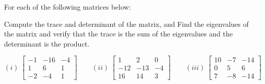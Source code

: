 \begin{exercise}\ansMark%
For each of the following matrices below:
\begin{tasks}
\task Compute the trace and determinant of the matrix, and
\task Find the eigenvalues of the matrix and verify that the trace is the sum of the eigenvalues and the determinant is the product. 
\end{tasks}
\begin{equation*}
(i) \ \begin{bmatrix} -1 & -16 & -4 \\ 1 & 6 & 1 \\ -2 & -4 & 1  \end{bmatrix} \qquad (ii) \ \begin{bmatrix} 1 & 2 & 0 \\ -12 & -13 & -4 \\ 16 & 14 & 3  \end{bmatrix} \qquad (iii)\ \begin{bmatrix} 10 & -7 & -14 \\ 0 & 5 & 6 \\ 7 & -8 & -14 \end{bmatrix}
\end{equation*}
\end{exercise}
%

\setcounter{exercise}{100}







